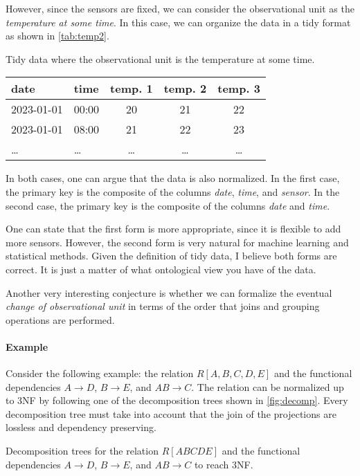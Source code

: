 However, since the sensors are fixed, we can consider the observational unit as the
\emph{temperature at some time}.  In this case, we can organize the data in a tidy format
as shown in \cref{tab:temp2}.

\begin{tablebox}[label=tab:temp2]{Tidy data where the observational unit is the temperature at some time.}
  \centering
  \begin{tabular}{llccc}
    \toprule
    date & time & temp. 1 & temp. 2 & temp. 3 \\
    \midrule
    2023-01-01 & 00:00 & 20 & 21 & 22 \\
    2023-01-01 & 08:00 & 21 & 22 & 23 \\
    \dots & \dots & \dots & \dots & \dots \\
    \bottomrule
  \end{tabular}
\end{tablebox}

In both cases, one can argue that the data is also normalized.  In the first case, the
primary key is the composite of the columns \emph{date}, \emph{time}, and \emph{sensor}.
In the second case, the primary key is the composite of the columns \emph{date} and
\emph{time}.

One can state that the first form is more appropriate, since it is flexible to add more
sensors.  However, the second form is very natural for machine learning and statistical
methods.  Given the definition of tidy data, I believe both forms are correct.  It is
just a matter of what ontological view you have of the data.

Another very interesting conjecture is whether we can formalize the eventual \emph{change
of observational unit} in terms of the order that joins and grouping operations are
performed.

\paragraph{Example}
Consider the following example: the relation $R[A, B, C, D, E]$ and the functional
dependencies $A \to D$, $B \to E$, and $AB \to C$.  The relation can be normalized up to
3NF by following one of the decomposition trees shown in \cref{fig:decomp}.
Every decomposition tree must take into account that the join of the projections are
lossless and dependency preserving.

\begin{figurebox}[label=fig:decomp]{Decomposition trees for the relation $R[ABCDE]$ and
  the functional dependencies $A \to D$, $B \to E$, and $AB \to C$ to reach 3NF.}
  \centering
\end{figurebox}

